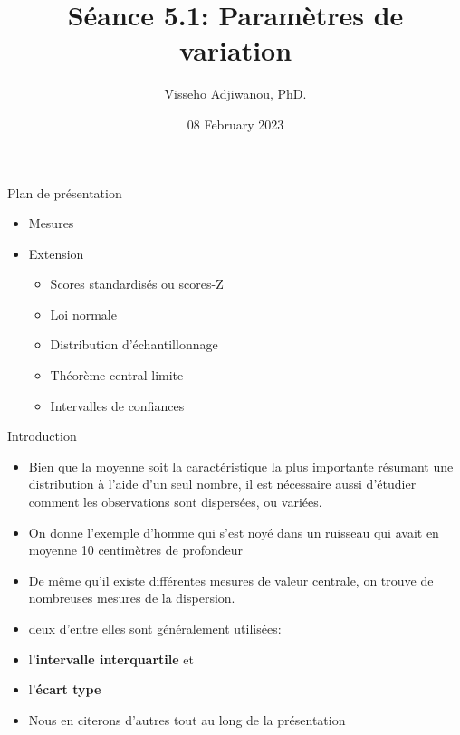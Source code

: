 \documentclass[
  ignorenonframetext,
]{beamer}
\title{Séance 5.1: Paramètres de variation}
\author{Visseho Adjiwanou, PhD.}
\date{08 February 2023}
\providecommand{\tightlist}{%
  \setlength{\itemsep}{0pt}\setlength{\parskip}{0pt}}
\begin{document}
\frame{\titlepage}

\begin{frame}{Plan de présentation}
\protect\hypertarget{plan-de-pruxe9sentation}{}
\begin{itemize}
\item
  Mesures
\item
  Extension

  \begin{itemize}
  \tightlist
  \item
    Scores standardisés ou scores-Z
  \item
    Loi normale
  \item
    Distribution d'échantillonnage
  \item
    Théorème central limite
  \item
    Intervalles de confiances
  \end{itemize}
\end{itemize}
\end{frame}

\begin{frame}{Introduction}
\protect\hypertarget{introduction}{}
\begin{itemize}
\tightlist
\item
  Bien que la moyenne soit la caractéristique la plus importante
  résumant une distribution à l'aide d'un seul nombre, il est nécessaire
  aussi d'étudier comment les observations sont dispersées, ou variées.
\end{itemize}

\begin{itemize}[<+->]
\tightlist
\item
  On donne l'exemple d'homme qui s'est noyé dans un ruisseau qui avait
  en moyenne 10 centimètres de profondeur
\end{itemize}

\begin{itemize}[<+->]
\tightlist
\item
  De même qu'il existe différentes mesures de valeur centrale, on trouve
  de nombreuses mesures de la dispersion.
\end{itemize}

\begin{itemize}[<+->]
\tightlist
\item
  deux d'entre elles sont généralement utilisées:
\item
  l'\textbf{intervalle interquartile} et
\item
  l'\textbf{écart type}
\end{itemize}

\begin{itemize}[<+->]
\tightlist
\item
  Nous en citerons d'autres tout au long de la présentation
\end{itemize}
\end{frame}
\end{document}
